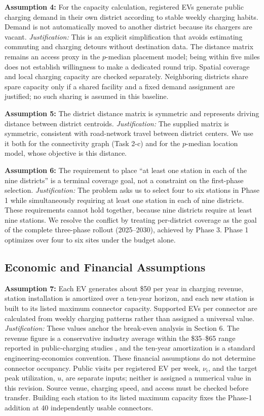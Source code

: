 \documentclass[12pt]{article}
\begin{document}
\textbf{Assumption 4:} For the capacity calculation, registered EVs generate public
charging demand in their own district according to stable weekly charging habits.
Demand is not automatically moved to another district because its chargers are vacant.
\textit{Justification:} This is an explicit simplification that avoids estimating commuting
and charging detours without destination data. The distance matrix remains an access proxy
in the $p$-median placement model; being within five miles does not establish willingness
to make a dedicated round trip. Spatial coverage and local charging capacity are checked
separately. Neighboring districts share spare capacity only if a shared facility and a
fixed demand assignment are justified; no such sharing is assumed in this baseline.

\textbf{Assumption 5:} The district distance matrix is symmetric and represents driving
distance between district centroids.
\textit{Justification:} The supplied matrix is symmetric, consistent with road-network
travel between district centers. We use it both for the connectivity graph (Task 2-c) and
for the $p$-median location model, whose objective is this distance.

\textbf{Assumption 6:} The requirement to place ``at least one station in each of the nine
districts'' is a terminal coverage goal, not a constraint on the first-phase selection.
\textit{Justification:} The problem asks us to select four to six stations in Phase 1 while
simultaneously requiring at least one station in each of nine districts. These
requirements cannot hold together, because nine districts require at least nine stations.
We resolve the conflict by treating per-district coverage as the goal of the complete
three-phase rollout (2025--2030), achieved by Phase 3. Phase 1 optimizes over four to six
sites under the budget alone.

\subsection{Economic and Financial Assumptions}

\textbf{Assumption 7:} Each EV generates about \$50 per year in charging revenue, station
installation is amortized over a ten-year horizon, and each new station is built to its
listed maximum connector capacity. Supported EVs per connector are calculated from
weekly charging patterns rather than assigned a universal value.
\textit{Justification:} These values anchor the break-even analysis in Section 6. The
revenue figure is a conservative industry average within the \$35--\$65 range reported in
public-charging studies \cite{NREL2017, Funke2019, IEA2024}, and the ten-year amortization is a
standard engineering-economics convention. These financial assumptions do not determine
connector occupancy. Public visits per registered EV per week, $\nu_i$, and the target
peak utilization, $u$, are separate inputs; neither is assigned a numerical value in this
revision. Source venue, charging speed, and access must be checked before transfer.
Building each station to its listed maximum capacity fixes the Phase-1 addition at
40 independently usable connectors.
\end{document}
